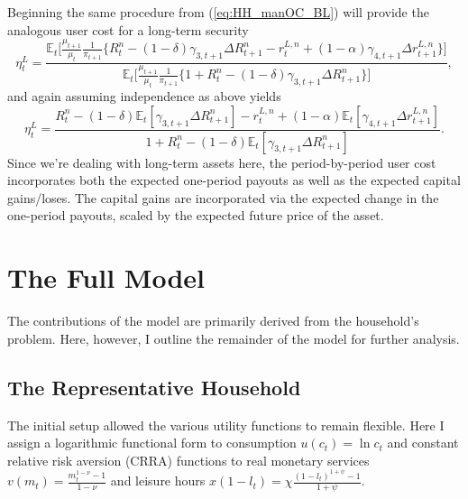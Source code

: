 \documentclass[11pt,a4paper,margin=1.5in]{article}
\begin{document}
Beginning the same procedure from (\ref{eq:HH_manOC_BL}) will provide the analogous user cost for a long-term security
\begin{equation}
\eta^L_t = \frac{\mathbb{E}_t \Big[ \frac{\mu_{t+1}}{\mu_{t}}\frac{1}{\pi_{t+1}} \Big\{ R^n_t - (1-\delta)\gamma_{3,t+1}\Delta R^n_{t+1} - r^{L,n}_t + (1-\alpha)\gamma_{4,t+1}\Delta r^{L,n}_{t+1}\Big\}\Big]}{\mathbb{E}_t \Big[ \frac{\mu_{t+1}}{\mu_{t}}\frac{1}{\pi_{t+1}} \Big\{ 1+ R^n_t - (1-\delta)\gamma_{3,t+1}\Delta R^n_{t+1}\Big\}\Big]},
\end{equation}
and again assuming independence as above yields
\begin{equation}
\eta^L_t = \frac{R^n_t - (1-\delta)\mathbb{E}_t[\gamma_{3,t+1}\Delta R^n_{t+1}] - r^{L,n}_t + (1-\alpha)\mathbb{E}_t[\gamma_{4,t+1}\Delta r^{L,n}_{t+1}]}{1+ R^n_t - (1-\delta)\mathbb{E}_t[\gamma_{3,t+1}\Delta R^n_{t+1}]}.
\label{eq:usercost_LT}
\end{equation}
Since we're dealing with long-term assets here, the period-by-period user cost incorporates both the expected one-period payouts as well as the expected capital gains/loses.
The capital gains are incorporated via the expected change in the one-period payouts, scaled by the expected future price of the asset.

\newpage
\section{The Full Model}
\label{app:Model}

The contributions of the model are primarily derived from the household's problem.
Here, however, I outline the remainder of the model for further analysis.

\subsection{The Representative Household}
The initial setup allowed the various utility functions to remain flexible.
Here I assign a logarithmic functional form to consumption $u(c_t) = \ln{c_t}$ and constant relative risk aversion (CRRA) functions to real monetary services $v(m_t) = \frac{m_t^{1-\nu} -1}{1-\nu}$ and leisure hours $x(1-l_t) = \chi \frac{(1-l_t)^{1+\psi}-1}{1+\psi}$. 
\end{document}
